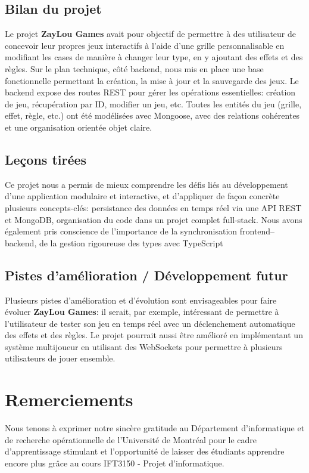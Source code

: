 \documentclass[12pt]{article}        %
\begin{document}
\subsection{Bilan du projet}
\label{subsec:Bilan}
Le projet \textbf{ZayLou Games} avait pour objectif de permettre à des
utilisateur de concevoir leur propres jeux interactifs à l'aide d'une 
grille personnalisable en modifiant les cases de manière à changer leur
type, en y ajoutant des effets et des règles. Sur le plan technique, côté
backend, nous mis en place une base fonctionnelle permettant la création,
la mise à jour et la sauvegarde des jeux. Le backend expose des routes
REST pour gérer les opérations essentielles: création de jeu, 
récupération par ID, modifier un jeu, etc. Toutes les entités du jeu 
(grille, effet, règle, etc.) ont été modélisées avec Mongoose, avec des 
relations cohérentes et une organisation orientée objet claire.

\subsection{Leçons tirées}
\label{subsec:Leçons}
Ce projet nous a permis de mieux comprendre les défis liés au 
développement d’une application modulaire et interactive, et 
d’appliquer de façon concrète plusieurs concepts-clés: persistance des
données en temps réel via une API REST et MongoDB, organisation du code
dans un projet complet full-stack. Nous avons également pris conscience 
de l’importance de la synchronisation frontend–backend, de la gestion 
rigoureuse des types avec TypeScript

\subsection{Pistes d’amélioration / Développement futur}
\label{subsec:Amelioration}
Plusieurs pistes d'amélioration et d'évolution sont envisageables pour
faire évoluer \textbf{ZayLou Games}: il serait, par exemple, intéressant 
de permettre à l'utilisateur de tester son jeu en temps réel avec 
un déclenchement automatique des effets et des règles. Le projet
pourrait aussi être amélioré en implémentant un système multijoueur en 
utilisant des WebSockets pour permettre à plusieurs utilisateurs de 
jouer ensemble.

\section{Remerciements}
\label{sec:Remerciements}
Nous tenons à exprimer notre sincère gratitude au Département 
d’informatique et de recherche opérationnelle de l’Université de 
Montréal pour le cadre d’apprentissage stimulant et l'opportunité 
de laisser des étudiants apprendre encore plus grâce au cours
IFT3150 - Projet d'informatique.
\end{document}
